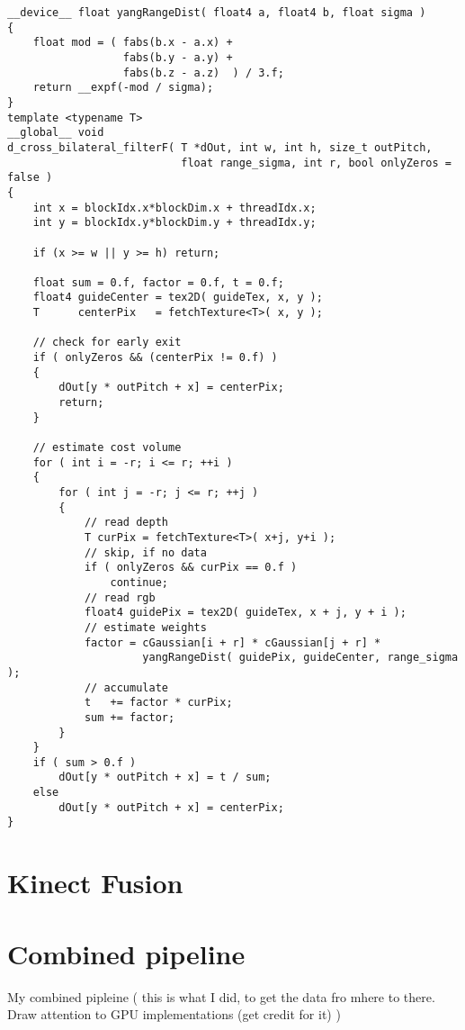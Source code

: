 \documentclass{ucl_thesis}
\begin{document}
\lstset{style=customcpp}
\begin{lstlisting}
__device__ float yangRangeDist( float4 a, float4 b, float sigma )
{
    float mod = ( fabs(b.x - a.x) +
                  fabs(b.y - a.y) +
                  fabs(b.z - a.z)  ) / 3.f;
    return __expf(-mod / sigma);
}
template <typename T>
__global__ void
d_cross_bilateral_filterF( T *dOut, int w, int h, size_t outPitch,
                           float range_sigma, int r, bool onlyZeros = false )
{
    int x = blockIdx.x*blockDim.x + threadIdx.x;
    int y = blockIdx.y*blockDim.y + threadIdx.y;

    if (x >= w || y >= h) return;

    float sum = 0.f, factor = 0.f, t = 0.f;
    float4 guideCenter = tex2D( guideTex, x, y );
    T      centerPix   = fetchTexture<T>( x, y );

    // check for early exit
    if ( onlyZeros && (centerPix != 0.f) )
    {
        dOut[y * outPitch + x] = centerPix;
        return;
    }

    // estimate cost volume
    for ( int i = -r; i <= r; ++i )
    {
        for ( int j = -r; j <= r; ++j )
        {
            // read depth
            T curPix = fetchTexture<T>( x+j, y+i );
            // skip, if no data
            if ( onlyZeros && curPix == 0.f )
                continue;
            // read rgb
            float4 guidePix = tex2D( guideTex, x + j, y + i );
            // estimate weights
            factor = cGaussian[i + r] * cGaussian[j + r] *
                     yangRangeDist( guidePix, guideCenter, range_sigma );
            // accumulate
            t   += factor * curPix;
            sum += factor;
        }
    }
    if ( sum > 0.f )
        dOut[y * outPitch + x] = t / sum;
    else
        dOut[y * outPitch + x] = centerPix;
}

\end{lstlisting}

\section{Kinect Fusion}

\section{Combined pipeline}
My combined pipleine ( this is what I did, to get the data fro mhere to there. Draw attention to GPU implementations (get credit for it) )
\end{document}
